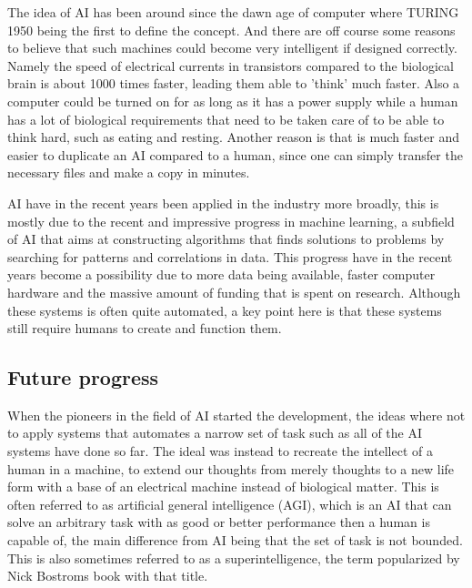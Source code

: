 \documentclass[12pt,A4]{report}
\theoremstyle{definition}
\begin{document}
The idea of AI has been around since the dawn age of computer where TURING 1950 being the first to define the concept. And there are off course some reasons to believe that such machines could become very intelligent if designed correctly. Namely the speed of electrical currents in transistors compared to the biological brain is about 1000 times faster, leading them able to 'think' much faster. Also a computer could be turned on for as long as it has a power supply while a human has a lot of biological requirements that need to be taken care of to be able to think hard, such as eating and resting. Another reason is that is much faster and easier to duplicate an AI compared to a human, since one can simply transfer the necessary files and make a copy in minutes. 

AI have in the recent years been applied in the industry more broadly, this is mostly due to the recent and impressive progress in machine learning, a subfield of AI that aims at constructing algorithms that finds solutions to problems by searching for patterns and correlations in data. This progress have in the recent years become a possibility due to more data being available, faster computer hardware and the massive amount of funding that is spent on research. Although these systems is often quite automated, a key point here is that these systems still require humans to create and function them.


\subsection{Future progress}
When the pioneers in the field of AI started the development, the ideas where not to apply systems that automates a narrow set of task such as all of the AI systems have done so far. The ideal was instead to recreate the intellect of a human in a machine, to extend our thoughts from merely thoughts to a new life form with a base of an electrical machine instead of biological matter. This is often referred to as artificial general intelligence (AGI), which is an AI that can solve an arbitrary task with as good or better performance then a human is capable of, the main difference from AI being that the set of task is not bounded. This is also sometimes referred to as a superintelligence, the term popularized by Nick Bostroms book with that title. 
\end{document}
